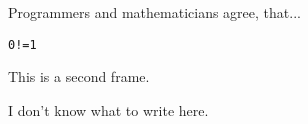 \documentclass{beamer}
\begin{document}
\begin{frame}
  Programmers and mathematicians agree, that...
  \pause

  \texttt{0!=1}
\end{frame}

\begin{frame}
    This is a second frame.
    \pause

    I don't know what to write here.
\end{frame}
\end{document}
